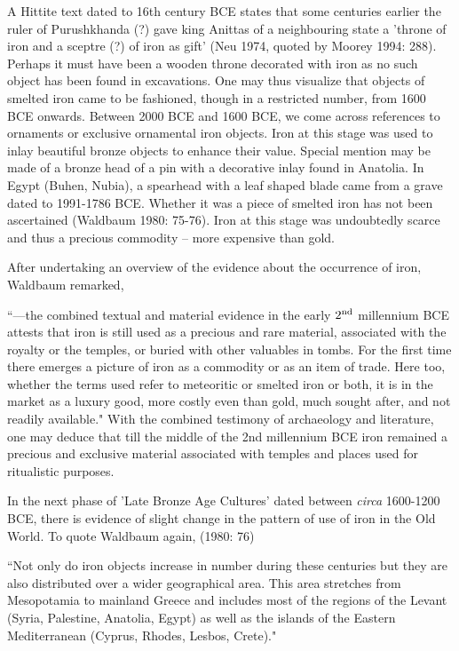 A Hittite text dated to 16th century BCE states that some centuries earlier the ruler of Purushkhanda (?) gave king Anittas of a neighbouring state a 'throne of iron and a sceptre (?) of iron as gift' (Neu 1974, quoted by Moorey 1994: 288). Perhaps it must have been a wooden throne decorated with iron as no such object has been found in excavations. One may thus visualize that objects of smelted iron came to be fashioned, though in a restricted number, from 1600 BCE onwards. Between 2000 BCE and 1600 BCE, we come across references to ornaments or exclusive ornamental iron objects. Iron at this stage was used to inlay beautiful bronze objects to enhance their value. Special mention may be made of a bronze head of a pin with a decorative inlay found in Anatolia. In Egypt (Buhen, Nubia), a spearhead with a leaf shaped blade came from a grave dated to 1991-1786 BCE. Whether it was a piece of smelted iron has not been ascertained (Waldbaum 1980: 75-76). Iron at this stage was undoubtedly scarce and thus a precious commodity – more expensive than gold. 

After undertaking an overview of the evidence about the occurrence of iron, Waldbaum remarked, 

{\footnotesize ``---the combined textual and material evidence in the early $2^{\rm nd}$ millennium BCE attests that iron is still used as a precious and rare material, associated with the royalty or the temples, or buried with other valuables in tombs. For the first time there emerges a picture of iron as a commodity or as an item of trade. Here too, whether the terms used refer to meteoritic or smelted iron or both, it is in the market as a luxury good, more costly even than gold, much sought after, and not readily available."} With the combined testimony of archaeology and literature, one may deduce that till the middle of the 2nd millennium BCE iron remained a precious and exclusive material associated with temples and places used for ritualistic purposes.

In the next phase of 'Late Bronze Age Cultures’ dated  between \textit{circa} 1600-1200 BCE, there is evidence of slight change in the pattern of use of iron in the Old World. To quote Waldbaum again, (1980: 76)

{\footnotesize ``Not only do iron objects increase in number during these centuries but they are also distributed over a wider geographical area. This area stretches from Mesopotamia to mainland Greece and includes most of the regions of the Levant (Syria, Palestine, Anatolia, Egypt) as well as the islands of the Eastern Mediterranean (Cyprus, Rhodes, Lesbos, Crete)."}

